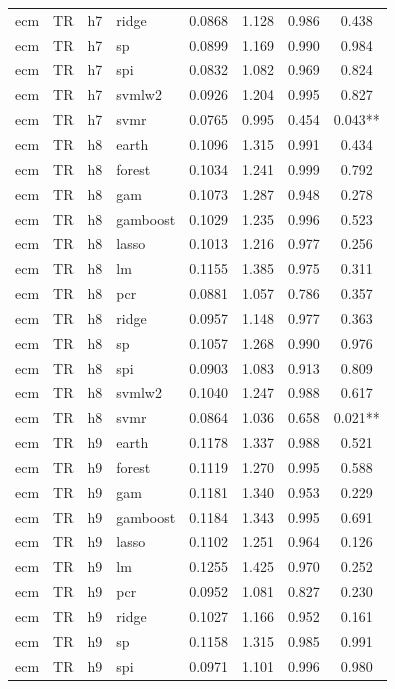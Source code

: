 \begin{ThreePartTable}
\begin{longtable}[t]{llclcccc}
ecm & TR & h7 & ridge & 0.0868 & 1.128 & 0.986 & 0.438\\
ecm & TR & h7 & sp & 0.0899 & 1.169 & 0.990 & 0.984\\
ecm & TR & h7 & spi & 0.0832 & 1.082 & 0.969 & 0.824\\
ecm & TR & h7 & svmlw2 & 0.0926 & 1.204 & 0.995 & 0.827\\
ecm & TR & h7 & svmr & 0.0765 & 0.995 & 0.454 & 0.043**\\
\addlinespace
ecm & TR & h8 & earth & 0.1096 & 1.315 & 0.991 & 0.434\\
ecm & TR & h8 & forest & 0.1034 & 1.241 & 0.999 & 0.792\\
ecm & TR & h8 & gam & 0.1073 & 1.287 & 0.948 & 0.278\\
ecm & TR & h8 & gamboost & 0.1029 & 1.235 & 0.996 & 0.523\\
ecm & TR & h8 & lasso & 0.1013 & 1.216 & 0.977 & 0.256\\
ecm & TR & h8 & lm & 0.1155 & 1.385 & 0.975 & 0.311\\
ecm & TR & h8 & pcr & 0.0881 & 1.057 & 0.786 & 0.357\\
ecm & TR & h8 & ridge & 0.0957 & 1.148 & 0.977 & 0.363\\
ecm & TR & h8 & sp & 0.1057 & 1.268 & 0.990 & 0.976\\
ecm & TR & h8 & spi & 0.0903 & 1.083 & 0.913 & 0.809\\
ecm & TR & h8 & svmlw2 & 0.1040 & 1.247 & 0.988 & 0.617\\
ecm & TR & h8 & svmr & 0.0864 & 1.036 & 0.658 & 0.021**\\
\addlinespace
ecm & TR & h9 & earth & 0.1178 & 1.337 & 0.988 & 0.521\\
ecm & TR & h9 & forest & 0.1119 & 1.270 & 0.995 & 0.588\\
ecm & TR & h9 & gam & 0.1181 & 1.340 & 0.953 & 0.229\\
ecm & TR & h9 & gamboost & 0.1184 & 1.343 & 0.995 & 0.691\\
ecm & TR & h9 & lasso & 0.1102 & 1.251 & 0.964 & 0.126\\
ecm & TR & h9 & lm & 0.1255 & 1.425 & 0.970 & 0.252\\
ecm & TR & h9 & pcr & 0.0952 & 1.081 & 0.827 & 0.230\\
ecm & TR & h9 & ridge & 0.1027 & 1.166 & 0.952 & 0.161\\
ecm & TR & h9 & sp & 0.1158 & 1.315 & 0.985 & 0.991\\
ecm & TR & h9 & spi & 0.0971 & 1.101 & 0.996 & 0.980\\

\end{longtable}
\end{ThreePartTable}
